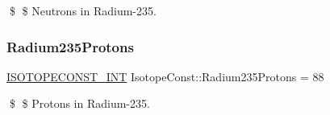 \$ \$ Neutrons in Radium-\/235. \mbox{\label{group___isotope_const-_radium-_ra235_gac52855d1a36ccca16411a4010726c1cf}} 
\subsubsection{\texorpdfstring{Radium235\+Protons}{Radium235Protons}}
{\footnotesize\ttfamily \mbox{\hyperlink{group___isotope_const-_macros_ga5f18360b3e99483a35c32d789e62621c}{I\+S\+O\+T\+O\+P\+E\+C\+O\+N\+S\+T\+\_\+\+I\+NT}} Isotope\+Const\+::\+Radium235\+Protons = 88}

\$ \$ Protons in Radium-\/235. 